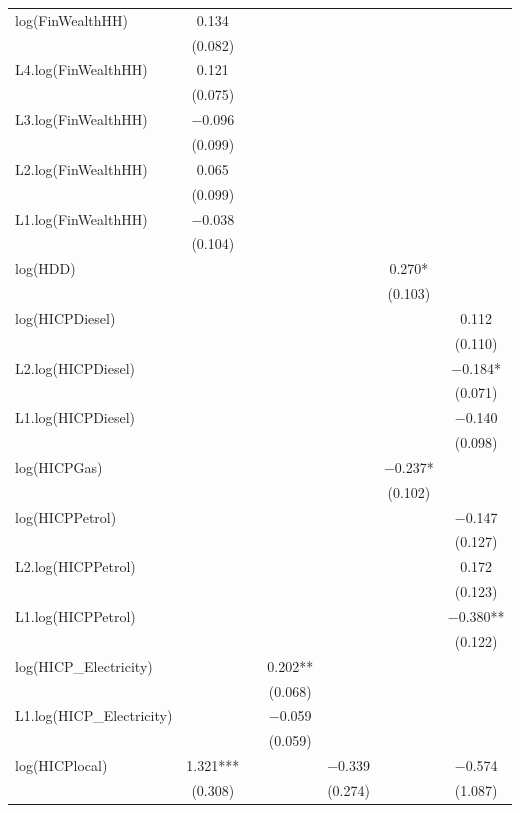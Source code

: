 \begin{table}
{\begin{tabular}[t]{lcccccc}
log(FinWealthHH) & \num{0.134} &  &  &  &  & \\
 & (\num{0.082}) &  &  &  &  & \\
L4.log(FinWealthHH) & \num{0.121} &  &  &  &  & \\
 & (\num{0.075}) &  &  &  &  & \\
L3.log(FinWealthHH) & \num{-0.096} &  &  &  &  & \\
 & (\num{0.099}) &  &  &  &  \vphantom{1} & \\
L2.log(FinWealthHH) & \num{0.065} &  &  &  &  & \\
 & (\num{0.099}) &  &  &  &  & \\
L1.log(FinWealthHH) & \num{-0.038} &  &  &  &  & \\
 & (\num{0.104}) &  &  &  &  & \\
log(HDD) &  &  &  &  & \num{0.270}* & \\
 &  &  &  &  & (\num{0.103}) & \\
log(HICPDiesel) &  &  &  &  &  & \num{0.112}\\
 &  &  &  &  &  & (\num{0.110})\\
L2.log(HICPDiesel) &  &  &  &  &  & \num{-0.184}*\\
 &  &  &  &  &  & (\num{0.071})\\
L1.log(HICPDiesel) &  &  &  &  &  & \num{-0.140}\\
 &  &  &  &  &  & (\num{0.098})\\
log(HICPGas) &  &  &  &  & \num{-0.237}* & \\
 &  &  &  &  & (\num{0.102}) & \\
log(HICPPetrol) &  &  &  &  &  & \num{-0.147}\\
 &  &  &  &  &  & (\num{0.127})\\
L2.log(HICPPetrol) &  &  &  &  &  & \num{0.172}\\
 &  &  &  &  &  & (\num{0.123})\\
L1.log(HICPPetrol) &  &  &  &  &  & \num{-0.380}**\\
 &  &  &  &  &  & (\num{0.122})\\
log(HICP\_Electricity) &  &  & \num{0.202}** &  &  & \\
 &  &  & (\num{0.068}) &  &  & \\
L1.log(HICP\_Electricity) &  &  & \num{-0.059} &  &  & \\
 &  &  & (\num{0.059}) &  &  & \\
log(HICPlocal) & \num{1.321}*** &  &  & \num{-0.339} &  & \num{-0.574}\\
 & (\num{0.308}) &  &  & (\num{0.274}) &  & (\num{1.087})\\

\end{tabular}}
\end{table}
